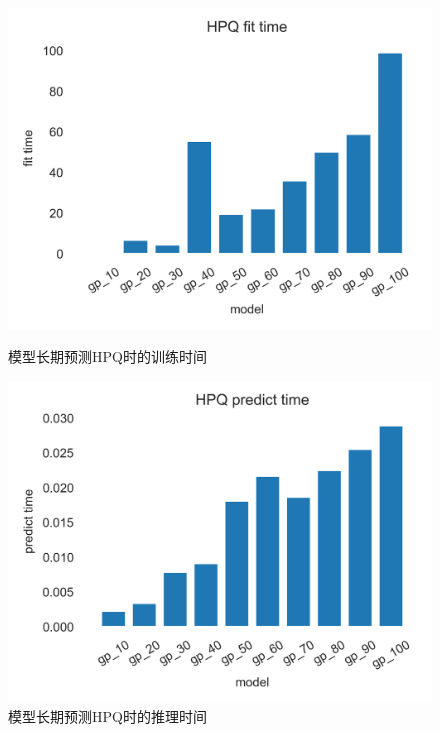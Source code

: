\begin{figure}[!htbp]
    \centering
    \begin{minipage}[t]{0.49\textwidth}
    \centering
    \includegraphics[width=\textwidth]{images/lab2/HPQ_fit_time.png}
    \caption{模型长期预测HPQ时的训练时间}\label{2HPQfittime}
    \end{minipage}
    \begin{minipage}[t]{0.49\textwidth}
    \centering
    \includegraphics[width=\textwidth]{images/lab2/HPQ_predict_time.png}
    \caption{模型长期预测HPQ时的推理时间}\label{2HPQpredicttime}
    \end{minipage}
\end{figure}

